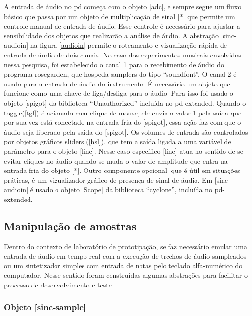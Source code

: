 \documentclass{ppgmus}
\begin{document}
A entrada de áudio no pd começa com o objeto  [adc\texttildelow], e sempre segue um fluxo
básico que passa por um objeto de multiplicação de sinal [*\texttildelow] que permite um
controle manual de entrada de áudio. Esse controle é necessário para ajustar 
a sensibilidade dos objetos que realizarão a análise de áudio. A abstração 
[sinc-audioin] na figura \ref{audioin} permite o roteamento e vizualização rápida 
de entrada de áudio de dois canais. No caso dos experimentos musicais envolvidos 
nessa pesquisa, foi estabelecido o canal 1 para o recebimento de áudio do programa 
rosegarden, que hospeda samplers do tipo ``soundfont''. O canal 2 é usado para 
a entrada de áudio do instrumento. É necessário um objeto que funcione como uma chave de
liga/desliga para o áudio. Para isso foi usado o objeto [spigot\texttildelow] da biblioteca
``Unauthorized'' incluída no pd-extended.
 Quando o toggle([tgl]) é acionado com clique de mouse,
ele envia o valor 1 pela saída que por sua vez está conectado na entrada fria do
[spigot\texttildelow], essa ação faz com que o áudio seja liberado pela saída do [spigot\texttildelow].
Os volumes de entrada são controlados por objetos gráficos sliders ([hsl]), que tem
a saída ligada a uma variável de parâmetro para o objeto [line\texttildelow]. Nesse caso específico
[line\texttildelow] atua no sentido de se evitar cliques no áudio quando se muda o valor de 
amplitude que entra na entrada fria do objeto [*\texttildelow]. Outro componente
opcional, que é útil em situações práticas, é um vizualizador gráfico de presença de sinal
de áudio. Em [sinc-audioin] é usado o objeto [Scope\texttildelow] da biblioteca ``cyclone'', 
incluída no pd-extended.


\subsection{Manipulação de amostras}


  Dentro do  contexto de laboratório de prototipação, se faz necessário emular uma entrada 
de áudio em tempo-real com a execução de trechos de áudio sampleados ou um sintetizador simples
com entrada de notas pelo teclado alfa-numérico do computador. Nesse sentido foram construídas
algumas abstrações para facilitar o processo de desenvolvimento e teste.

\subsubsection{Objeto [sinc-sample]}
\end{document}
